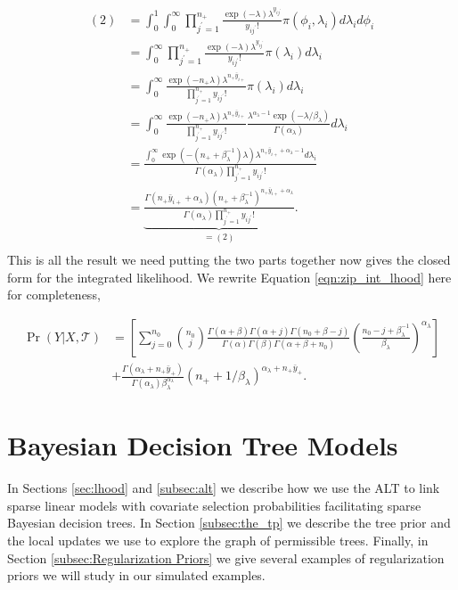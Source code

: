  \begin{align*}
 (2) &= \int_0^1\int_0^\infty\prod_{j^\prime=1}^{n_+}\frac{\exp{(-\lambda)}\lambda^{y_{ij^\prime}} }{y_{ij^\prime}!}\pi(\phi_i,\lambda_i )d\lambda_id\phi_i \\
 &= \int_0^\infty \prod_{j^\prime=1}^{n_+}\frac{\exp{(-\lambda)}\lambda^{y_{ij^\prime}} }{y_{ij^\prime}!}\pi(\lambda_i )d\lambda_i \\
 &= \int_0^\infty\frac{\exp{(-n_+\lambda)}\lambda^{n_+\bar{y}_{i+}} }{\prod_{j^\prime=1}^{n_+}y_{ij^\prime}!}\pi(\lambda_i )d\lambda_i \\
 &= \int_0^\infty\frac{\exp{(-n_+\lambda)}\lambda^{n_+\bar{y}_{i+}} }{\prod_{j^\prime=1}^{n_+}y_{ij^\prime}!}\frac{\lambda^{\alpha_{\lambda}-1}\exp{(-\lambda/\beta_{\lambda})}}{\Gamma(\alpha_{\lambda})}d\lambda_i \\
 &= \frac{\int_0^\infty\exp{(-(n_+ +\beta_{\lambda}^{-1})\lambda)}\lambda^{n_+\bar{y}_{i+} +\alpha_{\lambda}-1} d\lambda_i}{\Gamma(\alpha_{\lambda})\prod_{j^\prime=1}^{n_+}y_{ij^\prime}!} \\
 &= \underbrace{\frac{\Gamma(n_+\bar{y}_{i+}+\alpha_{\lambda})(n_+ +\beta_{\lambda}^{-1})^{n_+\bar{y}_{i+}+\alpha_{\lambda}}}{\Gamma(\alpha_{\lambda})\prod_{j^\prime=1}^{n_+}y_{ij^\prime}!}}_{=(2)}. \\
 \end{align*}
This is all the result we need putting the two parts together now gives the closed form for the integrated likelihood. We rewrite Equation \ref{eqn:zip_int_lhood} here for completeness, 

\begin{align}\nonumber
 \Pr(Y\vert X, \mathcal{T})& = \left[\sum_{j=0}^{n_0} {n_0 \choose j}\frac{\Gamma(\alpha+\beta)\Gamma(\alpha+j)\Gamma(n_0+\beta-j)}{\Gamma(\alpha)\Gamma(\beta)\Gamma(\alpha+\beta+n_0)}\left(\frac{n_0-j+\beta_{\lambda}^{-1}}{\beta_{\lambda}}\right)^{\alpha_{\lambda}} \right] \\ \nonumber
 & + \frac{\Gamma(\alpha_{\lambda}+n_+\bar{y}_+)}{\Gamma(\alpha_{\lambda})\beta_{\lambda}^{\alpha_{\lambda}}}\left(n_+ + 1/\beta_{\lambda} \right)^{\alpha_{\lambda}+n_+\bar{y}_+}.
\end{align}

\section{Bayesian Decision Tree Models}\label{sec:Model}

In Sections \ref{sec:lhood} and \ref{subsec:alt} we describe how we use the ALT to link sparse linear models with covariate selection probabilities facilitating sparse Bayesian decision trees. In Section \ref{subsec:the_tp} we describe the tree prior and the local updates we use to explore the graph of permissible trees. Finally, in Section \ref{subsec:Regularization Priors} we give several examples of regularization priors we will study in our simulated examples.

